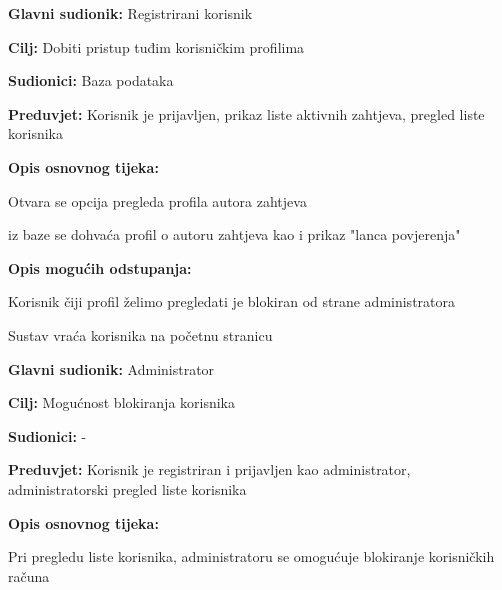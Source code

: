 \begin{packed_item}
	
	\item \textbf{Glavni sudionik: } Registrirani korisnik
	\item  \textbf{Cilj:} Dobiti pristup tuđim korisničkim profilima
	\item  \textbf{Sudionici:} Baza podataka
	\item  \textbf{Preduvjet:} Korisnik je prijavljen, prikaz liste aktivnih zahtjeva, pregled liste korisnika
	\item  \textbf{Opis osnovnog tijeka:}
	
	\item[] \begin{packed_enum}
		
		\item Otvara se opcija pregleda profila autora zahtjeva
		\item iz baze se dohvaća profil o autoru zahtjeva kao i prikaz "lanca povjerenja"
	\end{packed_enum}
	\item  \textbf{Opis mogućih odstupanja:}
	
	\item[] \begin{packed_item}
		
		\item[1.a] Korisnik čiji profil želimo pregledati je blokiran od strane administratora
		\item[] \begin{packed_enum}
			
			\item Sustav vraća korisnika na početnu stranicu
			
		\end{packed_enum}
		
	\end{packed_item}
\end{packed_item}

\noindent {}
\begin{packed_item}
	\item \textbf{Glavni sudionik: }Administrator
	\item  \textbf{Cilj:} Mogućnost blokiranja korisnika
	\item  \textbf{Sudionici:} -
	\item  \textbf{Preduvjet:} Korisnik je registriran i prijavljen kao administrator, administratorski pregled liste korisnika
	\item  \textbf{Opis osnovnog tijeka:}
	
	\item[] \begin{packed_enum}
		
		\item Pri pregledu liste korisnika, administratoru se omogućuje blokiranje korisničkih računa
	\end{packed_enum}
\end{packed_item}


